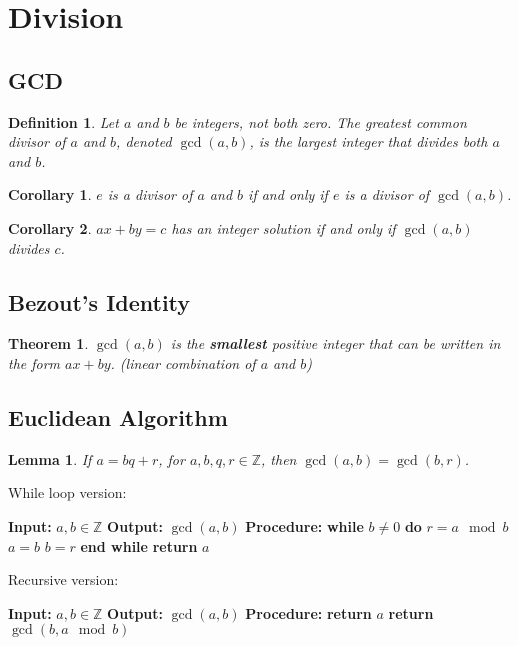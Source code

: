 \documentclass[letterpaper,12pt,oneside]{article}
\newtheorem{theorem}{Theorem}
\newtheorem{definition}{Definition}
\newtheorem*{corollary}{Corollary}
\newtheorem*{lemma}{Lemma}
\begin{document}
\section{Division}
\subsection{GCD}
\begin{definition}
    Let $a$ and $b$ be integers, not both zero. The greatest common divisor of $a$ and $b$, denoted $\gcd(a,b)$, is the largest integer that divides both $a$ and $b$.
\end{definition}
\begin{corollary}
    $e$ is a divisor of $a$ and $b$ if and only if $e$ is a divisor of $\gcd(a,b)$.
\end{corollary}
\begin{corollary}
    $ax+by=c$ has an integer solution if and only if $\gcd(a,b)$ divides $c$.
\end{corollary}
\subsection{Bezout's Identity}
\begin{theorem}
    $\gcd(a,b)$ is the \textbf{smallest} positive integer that can be written in the form $ax+by$. (linear combination of $a$ and $b$)
\end{theorem}
\subsection{Euclidean Algorithm}
\begin{lemma}
    If $a=bq+r$, for $a,b,q,r\in \mathbb{Z}$, then $\gcd(a,b) = \gcd(b,r)$.
\end{lemma}

While loop version:
    \begin{algorithmic}
      \STATE \textbf{Input:} $a,b\in \mathbb{Z}$
        \STATE \textbf{Output:} $\gcd(a,b)$
        \STATE \textbf{Procedure:}
        \STATE \textbf{while} $b\neq 0$ \textbf{do}
        \STATE \quad $r = a\mod b$
        \STATE \quad $a = b$
        \STATE \quad $b = r$
        \STATE \textbf{end while}
        \STATE \textbf{return} $a$
    \end{algorithmic}




Recursive version:
    \begin{algorithmic}
        \STATE \textbf{Input:} $a,b\in \mathbb{Z}$
            \STATE \textbf{Output:} $\gcd(a,b)$
            \STATE \textbf{Procedure:}
            \STATE \textbf{return} $a$
            \ELSE
            \STATE \textbf{return} $\gcd(b, a\mod b)$
            \ENDIF
    \end{algorithmic}
\end{document}
